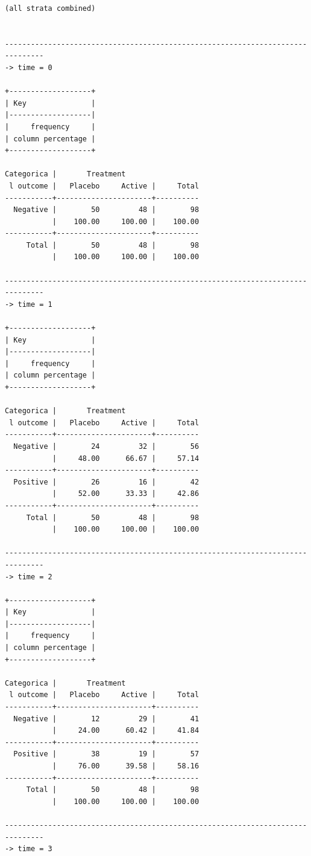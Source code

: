 \documentclass[
]{book}
\begin{document}
\begin{verbatim}
(all strata combined)


-------------------------------------------------------------------------------
-> time = 0

+-------------------+
| Key               |
|-------------------|
|     frequency     |
| column percentage |
+-------------------+

Categorica |       Treatment
 l outcome |   Placebo     Active |     Total
-----------+----------------------+----------
  Negative |        50         48 |        98 
           |    100.00     100.00 |    100.00 
-----------+----------------------+----------
     Total |        50         48 |        98 
           |    100.00     100.00 |    100.00 

-------------------------------------------------------------------------------
-> time = 1

+-------------------+
| Key               |
|-------------------|
|     frequency     |
| column percentage |
+-------------------+

Categorica |       Treatment
 l outcome |   Placebo     Active |     Total
-----------+----------------------+----------
  Negative |        24         32 |        56 
           |     48.00      66.67 |     57.14 
-----------+----------------------+----------
  Positive |        26         16 |        42 
           |     52.00      33.33 |     42.86 
-----------+----------------------+----------
     Total |        50         48 |        98 
           |    100.00     100.00 |    100.00 

-------------------------------------------------------------------------------
-> time = 2

+-------------------+
| Key               |
|-------------------|
|     frequency     |
| column percentage |
+-------------------+

Categorica |       Treatment
 l outcome |   Placebo     Active |     Total
-----------+----------------------+----------
  Negative |        12         29 |        41 
           |     24.00      60.42 |     41.84 
-----------+----------------------+----------
  Positive |        38         19 |        57 
           |     76.00      39.58 |     58.16 
-----------+----------------------+----------
     Total |        50         48 |        98 
           |    100.00     100.00 |    100.00 

-------------------------------------------------------------------------------
-> time = 3


\end{verbatim}
\end{document}
